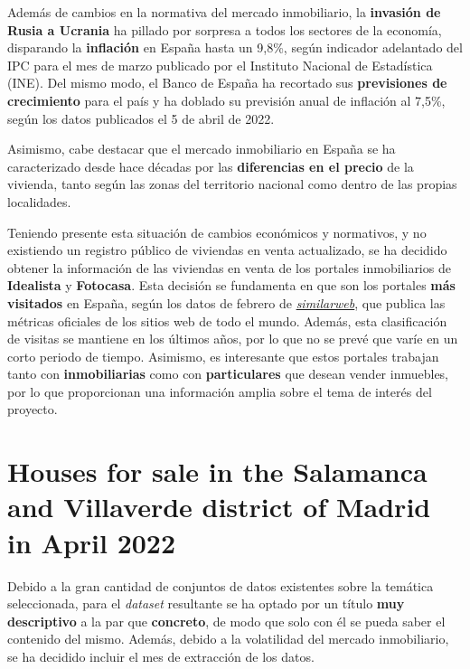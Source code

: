 \documentclass[12pt]{article}
\begin{document}
Además de cambios en la normativa del mercado inmobiliario, la \textbf{invasión de Rusia a Ucrania} ha pillado por sorpresa a todos los sectores de la economía, disparando la \textbf{inflación} en España hasta un 9,8\%, según indicador adelantado del IPC para el mes de marzo publicado por el Instituto Nacional de Estadística (INE). Del mismo modo, el Banco de España ha recortado sus \textbf{previsiones de crecimiento} para el país y ha doblado su previsión anual de inflación al 7,5\%, según los datos publicados el 5 de abril de 2022.

Asimismo, cabe destacar que el mercado inmobiliario en España se ha caracterizado desde hace décadas por las \textbf{diferencias en el precio} de la vivienda, tanto según las zonas del territorio nacional como dentro de las propias localidades. 

Teniendo presente esta situación de cambios económicos y normativos, y no existiendo un registro público de viviendas en venta actualizado, se ha decidido obtener la información de las viviendas en venta de los portales inmobiliarios de \textbf{Idealista} y \textbf{Fotocasa}. Esta decisión se fundamenta en que son los portales \textbf{más visitados} en España, según los datos de febrero de \href{https://www.similarweb.com/top-websites/spain/category/business-and-consumer-services/real-estate/}{\textit{similarweb}}, que publica las métricas oficiales de los sitios web de todo el mundo. Además, esta clasificación de visitas se mantiene en los últimos años, por lo que no se prevé que varíe en un corto periodo de tiempo. Asimismo, es interesante que estos portales trabajan tanto con \textbf{inmobiliarias} como con \textbf{particulares} que desean vender inmuebles, por lo que proporcionan una información amplia sobre el tema de interés del proyecto.


\vspace{-1.5em}\section{Houses for sale in the Salamanca and Villaverde district of Madrid in April 2022}\vspace{-1.0em}

Debido a la gran cantidad de conjuntos de datos existentes sobre la temática seleccionada, para el \textit{dataset} resultante se ha optado por un título \textbf{muy descriptivo} a la par que \textbf{concreto}, de modo que solo con él se pueda saber el contenido del mismo. Además, debido a la volatilidad del mercado inmobiliario, se ha decidido incluir el mes de extracción de los datos.
\end{document}
